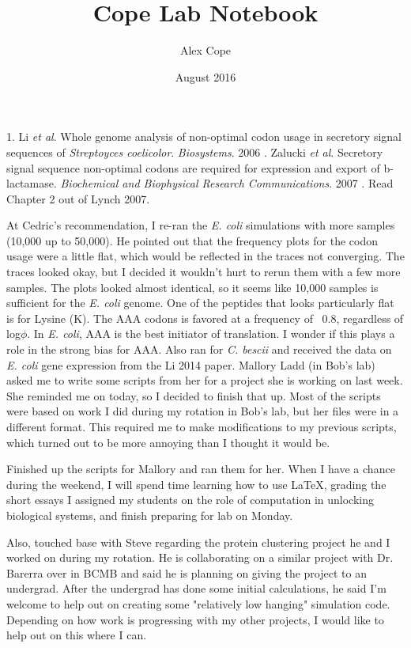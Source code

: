 \documentclass[11pt]{labbook}
\title{Cope Lab Notebook}
\author{Alex Cope}
\date{August 2016}
\begin{document}
\maketitle
\let\cleardoublepage\clearpage
{}
1. Li \textit{et al}.
Whole genome analysis of non-optimal codon usage in secretory signal sequences of \textit{Streptoyces coelicolor}. \textit{Biosystems}. 2006
. Zalucki \textit{et al}. Secretory signal sequence non-optimal codons are required for expression and export of b-lactamase. \textit{Biochemical and Biophysical Research Communications}. 2007
. Read Chapter 2 out of Lynch 2007.
\let\cleardoublepage\clearpage

At Cedric's recommendation, I re-ran the \textit{E. coli} simulations with more samples (10,000 up to 50,000). He pointed out that the frequency plots for the codon usage were a little flat, which would be reflected in the traces not converging. The traces looked okay, but I decided it wouldn't hurt to rerun them with a few more samples. The plots looked almost identical, so it seems like 10,000 samples is sufficient for the \textit{E. coli} genome. One of the peptides that looks particularly flat is for Lysine (K). The AAA codons is favored at a frequency of ~0.8, regardless of log$\phi$. In \textit{E. coli}, AAA is the best initiator of translation. I wonder if this plays a role in the strong bias for AAA.
\newline
Also ran for \textit{C. bescii} and received the data on \textit{E. coli} gene expression from the Li 2014 paper.
\newline
Mallory Ladd (in Bob's lab) asked me to write some scripts from her for a project she is working on last week. She reminded me on today, so I decided to finish that up. Most of the scripts were based on work I did during my rotation in Bob's lab, but her files were in a different format. This required me to make modifications to my previous scripts, which turned out to be more annoying than I thought it would be.

Finished up the scripts for Mallory and ran them for her. When I have a chance during the weekend, I will spend time learning how to use LaTeX, grading the short essays I assigned my students on the role of computation in unlocking biological systems, and finish preparing for lab on Monday.
\newline

Also, touched base with Steve regarding the protein clustering project he and I worked on during my rotation. He is collaborating on a similar project with Dr. Barerra over in BCMB and said he is planning on giving the project to an undergrad. After the undergrad has done some initial calculations, he said I'm welcome to help out on creating some "relatively low hanging" simulation code. Depending on how work is progressing with my other projects, I would like to help out on this where I can. 
\end{document}
